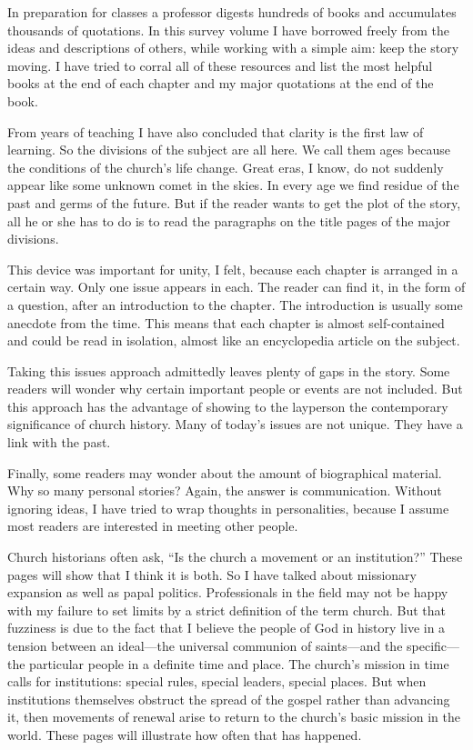In preparation for classes a professor digests hundreds of books and accumulates thousands of
quotations. In this survey volume I have borrowed freely from the ideas and descriptions of others,
while working with a simple aim: keep the story moving. I have tried to corral all of these
resources and list the most helpful books at the end of each chapter and my major quotations at the
end of the book.

From years of teaching I have also concluded that clarity is the first law of learning. So the
divisions of the subject are all here. We call them ages because the conditions of the church’s life
change. Great eras, I know, do not suddenly appear like some unknown comet in the skies. In every
age we find residue of the past and germs of the future. But if the reader wants to get the plot of
the story, all he or she has to do is to read the paragraphs on the title pages of the major
divisions.

This device was important for unity, I felt, because each chapter is arranged in a certain way. Only
one issue appears in each. The reader can find it, in the form of a question, after an introduction
to the chapter. The introduction is usually some anecdote from the time. This means that each
chapter is almost self-contained and could be read in isolation, almost like an encyclopedia article
on the subject.

Taking this issues approach admittedly leaves plenty of gaps in the story. Some readers will wonder
why certain important people or events are not included. But this approach has the advantage of
showing to the layperson the contemporary significance of church history. Many of today’s issues are
not unique. They have a link with the past.

Finally, some readers may wonder about the amount of biographical material. Why so many personal
stories? Again, the answer is communication. Without ignoring ideas, I have tried to wrap thoughts
in personalities, because I assume most readers are interested in meeting other people.

Church historians often ask, “Is the church a movement or an institution?” These pages will show
that I think it is both. So I have talked about missionary expansion as well as papal politics.
Professionals in the field may not be happy with my failure to set limits by a strict definition of
the term church. But that fuzziness is due to the fact that I believe the people of God in history
live in a tension between an ideal—the universal communion of saints—and the specific—the particular
people in a definite time and place. The church’s mission in time calls for institutions: special
rules, special leaders, special places. But when institutions themselves obstruct the spread of the
gospel rather than advancing it, then movements of renewal arise to return to the church’s basic
mission in the world. These pages will illustrate how often that has happened.


